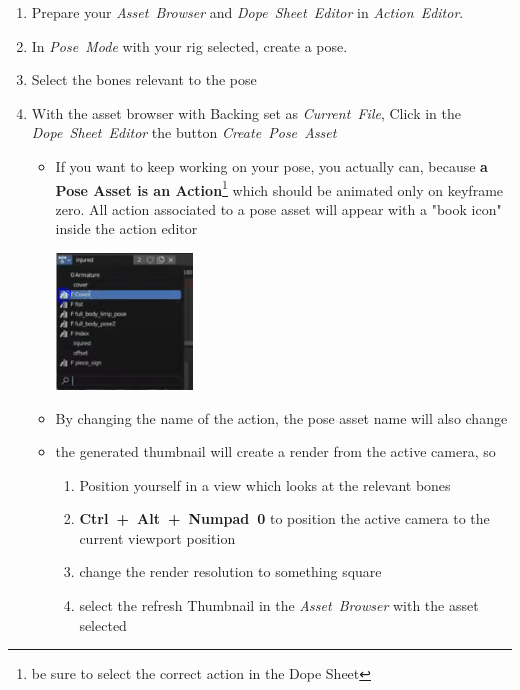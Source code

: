 \documentclass{article}
\begin{document}
\begin{enumerate}[noitemsep, topsep=0pt]
    \item Prepare your \mbox{\textit{Asset Browser}} and \mbox{\textit{Dope Sheet Editor}} in \mbox{\textit{Action Editor}}.
    \item In \mbox{\textit{Pose Mode}} with your rig selected, create a pose.
    \item Select the bones relevant to the pose
    \item With the asset browser with Backing set as \mbox{\textit{Current File}}, Click in the \mbox{\textit{Dope Sheet Editor}} the button \mbox{\textit{Create Pose Asset}}
    \begin{itemize}[noitemsep, topsep=0pt]
        \item If you want to keep working on your pose, you actually can, because \textbf{a Pose Asset is an Action}\footnote{be sure to select the correct action in the Dope Sheet}
        which should be animated only on keyframe zero. All action associated to a pose asset will appear with a "book icon" inside the action editor
        \begin{center}
            \includegraphics[width=0.3\textwidth]{blender_docs_images/my_icon_pose_asset.png}
        \end{center}
        \item By changing the name of the action, the pose asset name will also change
        \item the generated thumbnail will create a render from the active camera, so
        \begin{enumerate}[noitemsep, topsep=0pt]
            \item Position yourself in a view which looks at the relevant bones
            \item \mbox{\textbf{Ctrl + Alt + Numpad 0}} to position the active camera to the current viewport position
            \item change the render resolution to something square
            \item select the refresh Thumbnail in the \mbox{\textit{Asset Browser}} with the asset selected
        \end{enumerate}
    \end{itemize}
\end{enumerate}
\end{document}
